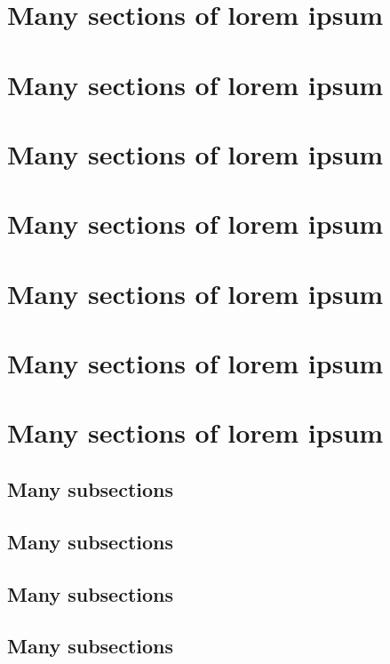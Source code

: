 \documentclass{rntz}
\begin{document}
\section{Many sections of lorem ipsum}
\lipsum[9]

\section{Many sections of lorem ipsum}
\lipsum[10]

\section{Many sections of lorem ipsum}
\lipsum[11]

\section{Many sections of lorem ipsum}
\lipsum[12]

\section{Many sections of lorem ipsum}
\lipsum[13]

\section{Many sections of lorem ipsum}
\lipsum[14]

\section{Many sections of lorem ipsum}
\lipsum[15]

\subsection{Many subsections}
\lipsum[16]

\subsection{Many subsections}
\lipsum[17]

\subsection{Many subsections}
\lipsum[18]

\subsection{Many subsections}
\lipsum[19]
\end{document}
